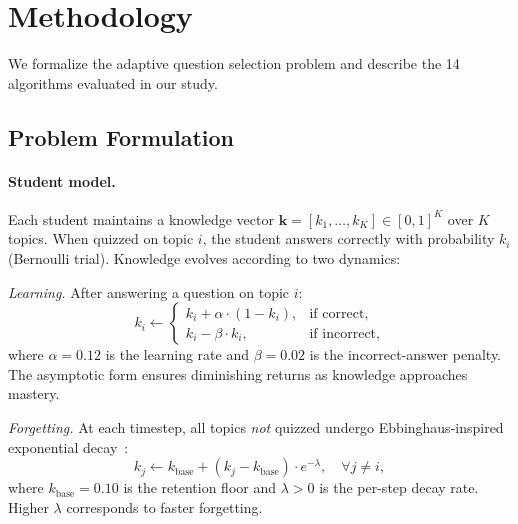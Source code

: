 \section{Methodology}
\label{sec:method}

We formalize the adaptive question selection problem and describe the 14 algorithms evaluated in our study.

\subsection{Problem Formulation}
\label{sec:formulation}

\paragraph{Student model.}
Each student maintains a knowledge vector $\mathbf{k} = [k_1, \ldots, k_K] \in [0,1]^K$ over $K$ topics.
When quizzed on topic $i$, the student answers correctly with probability $k_i$ (Bernoulli trial).
Knowledge evolves according to two dynamics:

\noindent\textit{Learning.}
After answering a question on topic $i$:
\begin{equation}
    k_i \leftarrow
    \begin{cases}
        k_i + \alpha \cdot (1 - k_i), & \text{if correct}, \\
        k_i - \beta \cdot k_i, & \text{if incorrect},
    \end{cases}
    \label{eq:learning}
\end{equation}
where $\alpha = 0.12$ is the learning rate and $\beta = 0.02$ is the incorrect-answer penalty.
The asymptotic form ensures diminishing returns as knowledge approaches mastery.

\noindent\textit{Forgetting.}
At each timestep, all topics \emph{not} quizzed undergo Ebbinghaus-inspired exponential decay~\citep{ebbinghaus1885memory}:
\begin{equation}
    k_j \leftarrow k_{\mathrm{base}} + (k_j - k_{\mathrm{base}}) \cdot e^{-\lambda}, \quad \forall j \neq i,
    \label{eq:forgetting}
\end{equation}
where $k_{\mathrm{base}} = 0.10$ is the retention floor and $\lambda > 0$ is the per-step decay rate.
Higher $\lambda$ corresponds to faster forgetting.

